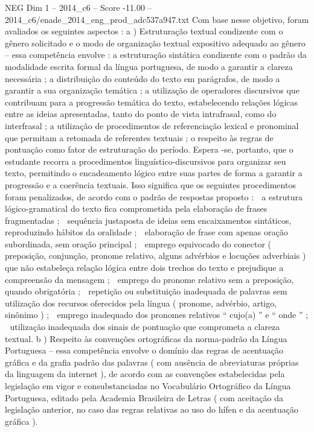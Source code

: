 \begin{textsample}{NEG Dim 1 – 2014\_c6 – Score -11.00 – 2014\_c6/enade\_2014\_eng\_prod\_adc537a947.txt}
Com base nesse objetivo, foram avaliados os seguintes aspectos : a ) Estruturação textual condizente com o gênero solicitado e o modo de organização textual expositivo adequado ao gênero – essa competência envolve : a estruturação sintática condizente com o padrão da modalidade escrita formal da língua portuguesa, de modo a garantir a clareza necessária ; a distribuição do conteúdo do texto em parágrafos, de modo a garantir a sua organização temática ; a utilização de operadores discursivos que contribuam para a progressão temática do texto, estabelecendo relações lógicas entre as ideias apresentadas, tanto do ponto de vista intrafrasal, como do interfrasal ; a utilização de procedimentos de referenciação lexical e pronominal que permitam a retomada de referentes textuais ; o respeito às regras de pontuação como fator de estruturação do período.
Espera -se, portanto, que o estudante recorra a procedimentos linguístico-discursivos para organizar seu texto, permitindo o encadeamento lógico entre suas partes de forma a garantir a progressão e a coerência textuais.
Isso significa que os seguintes procedimentos foram penalizados, de acordo com o padrão de respostas proposto :  a estrutura lógico-gramatical do texto fica comprometida pela elaboração de frases fragmentadas ;  sequência justaposta de ideias sem encaixamentos sintáticos, reproduzindo hábitos da oralidade ;  elaboração de frase com apenas oração subordinada, sem oração principal ;  emprego equivocado do conector ( preposição, conjunção, pronome relativo, alguns advérbios e locuções adverbiais ) que não estabeleça relação lógica entre dois trechos do texto e prejudique a compreensão da mensagem ;  emprego do pronome relativo sem a preposição, quando obrigatória ;  repetição ou substituição inadequada de palavras sem utilização dos recursos oferecidos pela língua ( pronome, advérbio, artigo, sinônimo ) ;  emprego inadequado dos pronomes relativos “ cujo(a) ” e “ onde ” ;  utilização inadequada dos sinais de pontuação que comprometa a clareza textual. b ) Respeito às convenções ortográficas da norma-padrão da Língua Portuguesa – essa competência envolve o domínio das regras de acentuação gráfica e da grafia padrão das palavras ( com ausência de abreviaturas próprias da linguagem da internet ), de acordo com as convenções estabelecidas pela legislação em vigor e consubstanciadas no Vocabulário Ortográfico da Língua Portuguesa, editado pela Academia Brasileira de Letras ( com aceitação da legislação anterior, no caso das regras relativas ao uso do hífen e da acentuação gráfica ).

\end{textsample}

